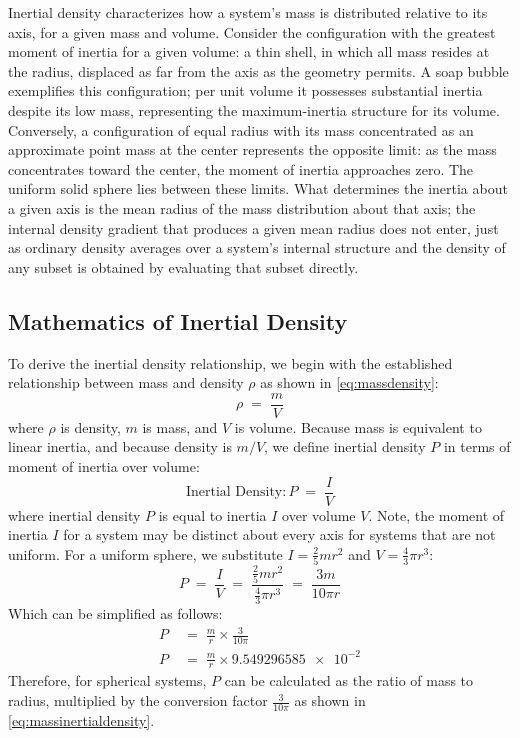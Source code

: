 \documentclass[twoside,twocolumn,9pt,fleqn]{article}
\begin{document}
Inertial density characterizes how a system's mass is distributed relative to its axis, for a given mass and volume. Consider the configuration with the greatest moment of inertia for a given volume: a thin shell, in which all mass resides at the radius, displaced as far from the axis as the geometry permits. A soap bubble exemplifies this configuration; per unit volume it possesses substantial inertia despite its low mass, representing the maximum-inertia structure for its volume. Conversely, a configuration of equal radius with its mass concentrated as an approximate point mass at the center represents the opposite limit: as the mass concentrates toward the center, the moment of inertia approaches zero. The uniform solid sphere lies between these limits. What determines the inertia about a given axis is the mean radius of the mass distribution about that axis; the internal density gradient that produces a given mean radius does not enter, just as ordinary density averages over a system's internal structure and the density of any subset is obtained by evaluating that subset directly.

\subsection{Mathematics of Inertial Density}
To derive the inertial density relationship, we begin with the established relationship between mass and density $\rho$ as shown in \eqref{eq:massdensity}:
\begin{equation}
\rho \;=\; \frac{m}{V}
\label{eq:massdensity}
\end{equation}
where $\rho$ is density, $m$ is mass, and $V$ is volume.
Because mass is equivalent to linear inertia, and because density is $m/V$, we define inertial density $P$ in terms of moment of inertia over volume:
\begin{equation}
\text{Inertial Density}: P \;=\; \frac{I}{V}
\label{eq:longinertialdensity}
\end{equation}
where inertial density $P$ is equal to inertia $I$ over volume $V$. Note, the moment of inertia $I$ for a system may be distinct about every axis for systems that are not uniform\cite{kerr1963}.
For a uniform sphere\cite{goldstein1980}, we substitute $I = \frac{2}{5}mr^2$ and $V = \frac{4}{3}\pi r^3$:
\begin{equation}
P \;=\; \frac{I}{V} \;=\; \frac{\frac{2}{5}mr^2}{\frac{4}{3}\pi r^3} \;=\; \frac{3m}{10\pi r}
\label{eq:sphericalP}
\end{equation}
Which can be simplified as follows:
\begin{align}
P \;&=\; \frac{m}{r} \times \frac{3}{10\pi} \\
P \;&=\; \frac{m}{r} \times \num{9.549296585e-2}
\label{eq:massinertialdensity}
\end{align}
Therefore, for spherical systems, $P$ can be calculated as the ratio of mass to radius, multiplied by the conversion factor $\frac{3}{10\pi}$ as shown in \eqref{eq:massinertialdensity}.
\end{document}
